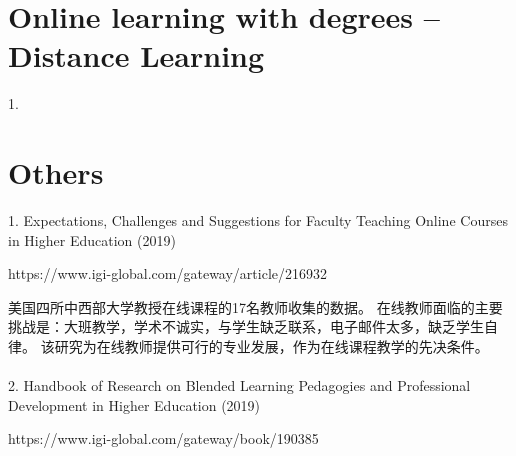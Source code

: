 \documentclass[onecolumn,aps,prd,groupedaddress,nofootinbib,notitlepage,12pt]{revtex4-1}
\begin{document}
\section{Online learning with degrees -- Distance Learning}
1. 


\section{Others}
1. Expectations, Challenges and Suggestions for Faculty Teaching Online Courses in Higher Education (2019)

https://www.igi-global.com/gateway/article/216932

美国四所中西部大学教授在线课程的17名教师收集的数据。
在线教师面临的主要挑战是：大班教学，学术不诚实，与学生缺乏联系，电子邮件太多，缺乏学生自律。
该研究为在线教师提供可行的专业发展，作为在线课程教学的先决条件。
\\\\
2. Handbook of Research on Blended Learning Pedagogies and Professional Development in Higher Education (2019)

https://www.igi-global.com/gateway/book/190385



\begin{thebibliography}{99}

%
\end{thebibliography}

\end{document}
